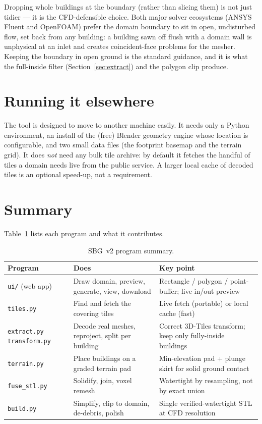 \documentclass[11pt]{article}
\newcommand{\code}[1]{\texttt{#1}}
\begin{document}
Dropping whole buildings at the boundary (rather than slicing them) is not just tidier --- it is
the CFD-defensible choice. Both major solver ecosystems (ANSYS Fluent and OpenFOAM) prefer the
domain boundary to sit in open, undisturbed flow, set back from any building: a building sawn
off flush with a domain wall is unphysical at an inlet and creates coincident-face problems for
the mesher. Keeping the boundary in open ground is the standard guidance, and it is what the
full-inside filter (Section~\ref{sec:extract}) and the polygon clip produce.

\section{Running it elsewhere}

The tool is designed to move to another machine easily. It needs only a Python environment, an
install of the (free) Blender geometry engine whose location is configurable, and two small data
files (the footprint basemap and the terrain grid). It does \emph{not} need any bulk tile
archive: by default it fetches the handful of tiles a domain needs live from the public service.
A larger local cache of decoded tiles is an optional speed-up, not a requirement.

\section{Summary}

Table~\ref{tab:v2phases} lists each program and what it contributes.

\begin{table}[h]
\centering
\begin{tabular}{@{}p{3.3cm}p{5.0cm}p{5.8cm}@{}}
\toprule
\textbf{Program} & \textbf{Does} & \textbf{Key point} \\
\midrule
\code{ui/} (web app) & Draw domain, preview, generate, view, download & Rectangle / polygon / point-buffer; live in/out preview \\
\code{tiles.py} & Find and fetch the covering tiles & Live fetch (portable) or local cache (fast) \\
\code{extract.py} \newline \code{transform.py} & Decode real meshes, reproject, split per building & Correct 3D-Tiles transform; keep only fully-inside buildings \\
\code{terrain.py} & Place buildings on a graded terrain pad & Min-elevation pad + plunge skirt for solid ground contact \\
\code{fuse\_stl.py} & Solidify, join, voxel remesh & Watertight by resampling, not by exact union \\
\code{build.py} & Simplify, clip to domain, de-debris, polish & Single verified-watertight STL at CFD resolution \\
\bottomrule
\end{tabular}
\caption{SBG~v2 program summary.}
\label{tab:v2phases}
\end{table}
\end{document}
